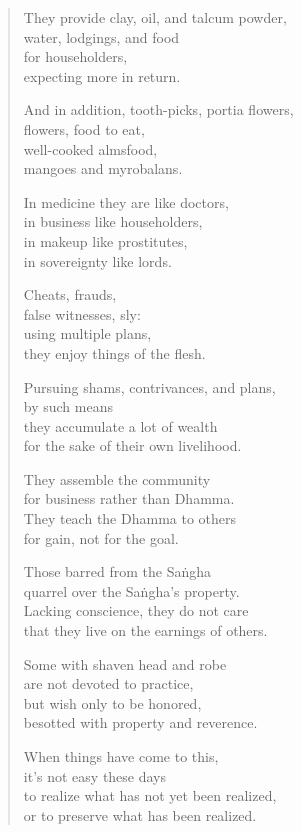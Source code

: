 \documentclass[12pt,openany]{book}%
\begin{document}
\begin{verse}
They provide clay, oil, and talcum powder, \\
water, lodgings, and food \\
for householders, \\
expecting more in return. 

And in addition, tooth-picks, portia flowers, \\
flowers, food to eat, \\
well-cooked almsfood, \\
mangoes and myrobalans. 

In medicine they are like doctors, \\
in business like householders, \\
in makeup like prostitutes, \\
in sovereignty like lords. 

Cheats, frauds, \\
false witnesses, sly: \\
using multiple plans, \\
they enjoy things of the flesh. 

Pursuing shams, contrivances, and plans, \\
by such means \\
they accumulate a lot of wealth \\
for the sake of their own livelihood. 

They assemble the community \\
for business rather than Dhamma. \\
They teach the Dhamma to others \\
for gain, not for the goal. 

Those barred from the \textsanskrit{Saṅgha} \\
quarrel over the \textsanskrit{Saṅgha}’s property. \\
Lacking conscience, they do not care \\
that they live on the earnings of others. 

Some with shaven head and robe \\
are not devoted to practice, \\
but wish only to be honored, \\
besotted with property and reverence. 

When things have come to this, \\
it’s not easy these days \\
to realize what has not yet been realized, \\
or to preserve what has been realized. 


\end{verse}
\end{document}

